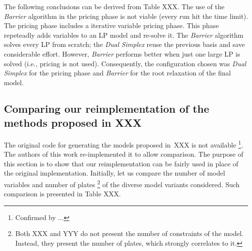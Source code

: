 \documentclass[smallextended]{svjour3}       %
\begin{document}
The following conclusions can be derived from Table XXX.
The use of the \emph{Barrier} algorithm in the pricing phase is not viable (every run hit the time limit).
The pricing phase includes a iterative variable pricing phase.
This phase repeteadly adds variables to an LP model and re-solve it.
The \emph{Barrier} algorithm solves every LP from scratch;
the \emph{Dual Simplex} reuse the previous basis and save considerable effort.
However, \emph{Barrier} performs better when just one large LP is solved
(i.e., pricing is not used).
Consequently, the configuration chosen was \emph{Dual Simplex} for the pricing phase and \emph{Barrier} for the root relaxation of the final model.

\subsection{Comparing our reimplementation of the methods proposed in XXX}

The original code for generating the models proposed in~XXX is not available
\footnote{Confirmed by ...}.
The authors of this work re-implemented it to allow comparison.
The purpose of this section is to show that our reimplementation can be fairly used in place of the original implementation.
Initially, let us compare the number of model variables and number of plates
\footnote{
Both XXX and YYY do not present the number of constraints of the model.
Instead, they present the number of plates, which strongly correlates to it.
} of the diverse model variants considered.
Such comparison is presented in Table XXX.
\end{document}
